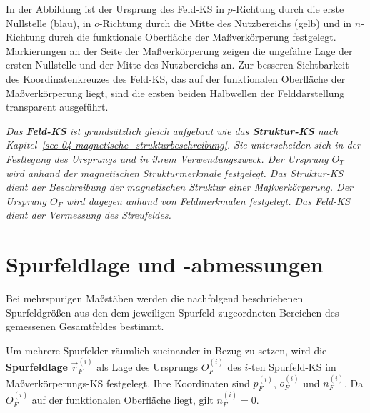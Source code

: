 \documentclass[
  ngerman,
  a4paper,
  twoside]{scrbook}
\newcounter{quartocallouttipno}
\newcommand{\quartocallouttip}[1]{\refstepcounter{quartocallouttipno}\label{#1}}
\begin{document}
In der Abbildung ist der Ursprung des Feld-KS in \(p\)-Richtung durch
die erste Nullstelle (blau), in \(o\)-Richtung durch die Mitte des
Nutzbereichs (gelb) und in \(n\)-Richtung durch die funktionale
Oberfläche der Maßverkörperung festgelegt. Markierungen an der Seite der
Maßverkörperung zeigen die ungefähre Lage der ersten Nullstelle und der
Mitte des Nutzbereichs an. Zur besseren Sichtbarkeit des
Koordinatenkreuzes des Feld-KS, das auf der funktionalen Oberfläche der
Maßverkörperung liegt, sind die ersten beiden Halbwellen der
Felddarstellung transparent ausgeführt.

\begin{tcolorbox}[enhanced jigsaw, arc=.35mm, bottomrule=.15mm, bottomtitle=1mm, breakable, colback=white, colbacktitle=quarto-callout-tip-color!10!white, colframe=quarto-callout-tip-color-frame, coltitle=black, left=2mm, leftrule=.75mm, opacityback=0, opacitybacktitle=0.6, rightrule=.15mm, title=\textcolor{quarto-callout-tip-color}{\faLightbulb}\hspace{0.5em}{Hinweis \ref*{tip-06-feld-struktur-KS}}, titlerule=0mm, toprule=.15mm, toptitle=1mm]

\quartocallouttip{tip-06-feld-struktur-KS} 

\emph{Das \textbf{Feld-KS} ist grundsätzlich gleich aufgebaut wie das
\textbf{Struktur-KS} nach
Kapitel~\ref{sec-04-magnetische_strukturbeschreibung}. Sie unterscheiden
sich in der Festlegung des Ursprungs und in ihrem Verwendungszweck. Der
Ursprung \(O_T\) wird anhand der magnetischen Strukturmerkmale
festgelegt. Das Struktur-KS dient der Beschreibung der magnetischen
Struktur einer Maßverkörperung. Der Ursprung \(O_F\) wird dagegen anhand
von Feldmerkmalen festgelegt. Das Feld-KS dient der Vermessung des
Streufeldes.}

\end{tcolorbox}

\section{Spurfeldlage und
-abmessungen}\label{sec-06-spurfeldlage_abmessungen}

Bei mehrspurigen Maßstäben werden die nachfolgend beschriebenen
Spurfeldgrößen aus den dem jeweiligen Spurfeld zugeordneten Bereichen
des gemessenen Gesamtfeldes bestimmt.

Um mehrere Spurfelder räumlich zueinander in Bezug zu setzen, wird die
\textbf{Spurfeldlage} \(\vec{r}_F^{(i)}\) als Lage des Ursprungs
\(O_F^{(i)}\) des \(i\)-ten Spurfeld-KS im Maßverkörperungs-KS
festgelegt. Ihre Koordinaten sind \(p_F^{(i)}\), \(o_F^{(i)}\) und
\(n_F^{(i)}\). Da \(O_F^{(i)}\) auf der funktionalen Oberfläche liegt,
gilt \(n_F^{(i)} = 0\).
\end{document}
